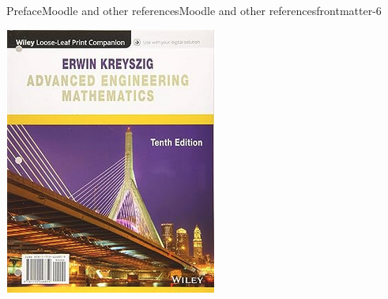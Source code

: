 \documentclass[oneside,10pt,]{book}
\numberwithin{equation}{section}
\begin{document}
\begin{preface}{Preface}{Moodle and other references}{}{Moodle and other references}{}{}{frontmatter-6}
\begin{itemize}[label=\textbullet]
\begin{image}{0.35}{0.3}{0.35}{}
\includegraphics[width=\linewidth]{external/intro_book_eng.png}
\end{image}%
%
\end{itemize}
%
\end{preface}
\setcounter{tocdepth}{1}
\renewcommand*\contentsname{Contents}
\tableofcontents
\mainmatter
%
%
\typeout{************************************************}
\typeout{************************************************}
%
\end{document}
